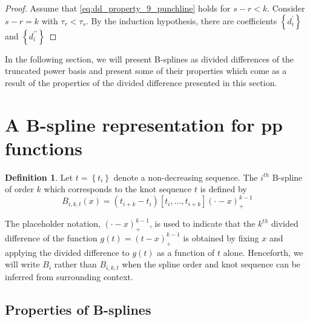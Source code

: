 \documentclass[12pt]{article}
\theoremstyle{definition}
\newtheorem{definition}{Definition}[section]
\begin{document}
\begin{enumerate}
\begin{proof}
Assume that \ref{eq:dd_property_9_punchline} holds for $s-r < k$. Consider $s-r = k$ with $\tau_r < \tau_s$. By the induction hypothesis, there are coefficients $\left\{d_i^\prime\right \}$ and $\left\{d_i^{\prime\prime}\right\}$
\end{proof}
\end{enumerate}

In the following section, we will present B-splines as divided differences of the truncated power basis and present some of their properties which come as a result of the properties of the divided difference presented in this section.

\section{A B-spline representation for pp functions}

\begin{definition} \label{definition:order_k_Bspline}
Let $t= \left\{ t_i \right\}$ denote a non-decreasing sequence. The $i^{th}$ B-spline of order $k$ which corresponds to the knot sequence $t$ is defined by 
\begin{equation} \label{eq:bspline_definition}
B_{i,k,t}\left(x\right) = \left(t_{i+k}-t_i\right)\left[t_i,\dots,t_{i+k}\right]\left(\cdot -x\right)_+^{k-1}
\end{equation}
\end{definition}

The placeholder notation, $\left(\cdot - x\right)_+^{k-1}$, is used to indicate that the $k^{th}$ divided difference of the function $g\left(t \right) = \left(t-x\right)^{k-1}_+$ is obtained by fixing $x$ and applying the divided difference to $g\left(t \right)$ as a function of $t$ alone. Henceforth, we will write $B_i$ rather than $B_{i,k,t}$ when the spline order and knot sequence can be inferred from surrounding context.

\subsection{Properties of B-splines}
\end{document}
